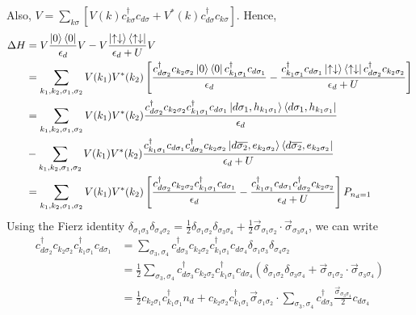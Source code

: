 \documentclass[twoside]{report}
\numberwithin{equation}{section}
\begin{document}
Also, \(V = \sum_{k\sigma}\left[V(k) c^\dagger_{k\sigma}c_{d\sigma} + V^*(k) c^\dagger_{d\sigma}c_{k\sigma}\right]\).
Hence,
\begin{equation}\begin{aligned}
\Delta H &= V\frac{\ket{0}\bra{0}}{\epsilon_d}V - V\frac{\ket{\uparrow\downarrow}\bra{\uparrow\downarrow}}{\epsilon_d + U}V\\
	 &= \sum_{k_1,k_2,\sigma_1,\sigma_2}V(k_1)V^*(k_2)\left[\frac{c^\dagger_{d\sigma_2} c_{k_2 \sigma_2}\ket{0}\bra{0}c^\dagger_{k_1\sigma_1} c_{d \sigma_1}}{\epsilon_d} - \frac{c^\dagger_{k_1\sigma_1} c_{d \sigma_1}\ket{\uparrow\downarrow}\bra{\uparrow\downarrow}c^\dagger_{d\sigma_2} c_{k_2 \sigma_2}}{\epsilon_d+U}\right]\\
&=\sum_{k_1,k_2,\sigma_1,\sigma_2}V(k_1)V^*(k_2)\frac{c^\dagger_{d\sigma_2} c_{k_2 \sigma_2}c^\dagger_{k_1\sigma_1} c_{d \sigma_1}\ket{d\sigma_1,h_{k_1\sigma_1}}\bra{d\sigma_1,h_{k_1\sigma_1}}}{\epsilon_d} \\
&- \sum_{k_1,k_2,\sigma_1,\sigma_2}V(k_1)V^*(k_2)\frac{c^\dagger_{k_1\sigma_1} c_{d \sigma_1}c^\dagger_{d\sigma_2} c_{k_2 \sigma_2}\ket{d\overline{\sigma_2},e_{k_2\sigma_2}}\bra{d\overline{\sigma_2},e_{k_2\sigma_2}}}{\epsilon_d+U}\\
&=\sum_{k_1,k_2,\sigma_1,\sigma_2}V(k_1)V^*(k_2)\left[\frac{c^\dagger_{d\sigma_2} c_{k_2 \sigma_2}c^\dagger_{k_1\sigma_1} c_{d \sigma_1}}{\epsilon_d} - \frac{c^\dagger_{k_1\sigma_1} c_{d \sigma_1}c^\dagger_{d\sigma_2} c_{k_2 \sigma_2}}{\epsilon_d+U}\right]P_{n_d=1}
\end{aligned}\end{equation}
Using the Fierz identity \(\delta_{\sigma_1\sigma_3}\delta_{\sigma_4\sigma_2} = \frac{1}{2}\delta_{\sigma_1\sigma_2}\delta_{\sigma_3\sigma_4} + \frac{1}{2}\vec\sigma_{\sigma_1\sigma_2}\cdot\vec\sigma_{\sigma_3\sigma_4}\), we can write
\begin{equation}\begin{aligned}
c^\dagger_{d\sigma_2} c_{k_2 \sigma_2}c^\dagger_{k_1\sigma_1} c_{d \sigma_1} &= \sum_{\sigma_3,\sigma_4}c^\dagger_{d\sigma_3} c_{k_2 \sigma_2}c^\dagger_{k_1\sigma_1} c_{d \sigma_4}\delta_{\sigma_1\sigma_3}\delta_{\sigma_4\sigma_2}\\
									     &=\frac{1}{2}\sum_{\sigma_3,\sigma_4}c^\dagger_{d\sigma_3} c_{k_2 \sigma_2}c^\dagger_{k_1\sigma_1} c_{d \sigma_4}\left(\delta_{\sigma_1\sigma_2}\delta_{\sigma_3\sigma_4} + \vec\sigma_{\sigma_1\sigma_2}\cdot\vec\sigma_{\sigma_3\sigma_4}\right)\\
&=\frac{1}{2} c_{k_2 \sigma_1}c^\dagger_{k_1\sigma_1}n_d+c_{k_2 \sigma_2}c^\dagger_{k_1\sigma_1}\vec\sigma_{\sigma_1\sigma_2}\cdot\sum_{\sigma_3,\sigma_4}c^\dagger_{d\sigma_3}\frac{\vec \sigma_{\sigma_3\sigma_4}}{2}c_{d\sigma_4}
\end{aligned}\end{equation}
\end{document}
